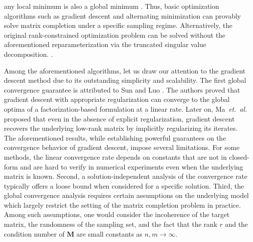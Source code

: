 \documentclass{article}
\newcommand{\hlnew}[1]{{#1}}
\begin{document}
any local minimum is also a global \hlnew{minimum} \cite{sun2016guaranteed,ge2016matrix}. Thus, basic optimization algorithms such as gradient descent \cite{chen2015fast,sun2016guaranteed,ma2018implicit} and alternating minimization \cite{chen2012matrix,jain2013low,hardt2014understanding,hardt2014fast} can provably solve matrix completion under a specific sampling regime. 
\hlnew{Alternatively, the original rank-constrained optimization problem can be solved without the aforementioned reparameterization via the truncated singular value decomposition.} \cite{jain2010guaranteed,goldfarb2011convergence,tanner2013normalized,jain2015fast,chunikhina2014performance,vu2019accelerating,vu2019local}. 

Among the aforementioned algorithms, let us draw our attention to the gradient descent method due to its outstanding simplicity and scalability. The first global convergence guarantee is attributed to Sun and Luo \cite{sun2016guaranteed}. The authors proved that gradient descent with appropriate regularization can converge to the global optima of a factorization-based formulation at a linear rate.
Later on, Ma~\textit{et.~al.} \cite{ma2018implicit} proposed that even in the absence of explicit regularization, gradient descent recovers the underlying low-rank matrix by implicitly regularizing its iterates. \hlnew{The} aforementioned results, while \hlnew{establishing} powerful guarantees on the convergence behavior of gradient descent, impose several limitations. 
For some methods, the linear convergence rate depends on \hlnew{constants that are not in closed-form and are} hard to verify in numerical \hlnew{experiments} even when the underlying matrix is known. Second, a solution-independent analysis of the convergence rate typically offers a loose bound when considered for a specific solution. 
Third, the global convergence analysis requires certain assumptions on the underlying model which largely restrict the setting of the matrix completion problem in practice. Among such assumptions, one would consider the \hlnew{incoherence} of the target matrix, the randomness of the sampling set, and the fact that the rank $r$ and the condition number of $\bm M$ are small constants as $n,m \to \infty$.
\end{document}

